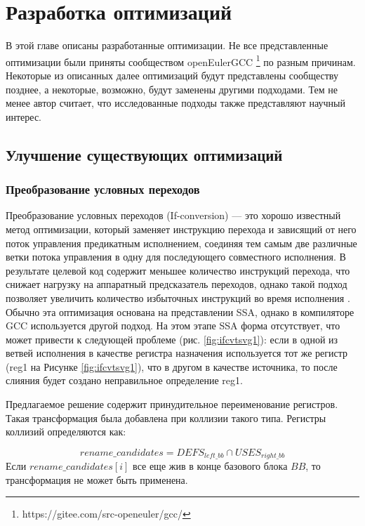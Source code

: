 \chapter{Разработка оптимизаций}\label{ch:ch2}

В этой главе описаны разработанные оптимизации. Не все представленные оптимизации были приняты сообществом openEulerGCC \footnote{https://gitee.com/src-openeuler/gcc/} по разным причинам. Некоторые из описанных далее оптимизаций будут представлены сообществу позднее, а некоторые, возможно, будут заменены другими подходами. Тем не менее автор считает, что исследованные подходы также представляют научный интерес.


\section{Улучшение существующих оптимизаций}\label{sec:ch2/sect1}
\subsection{Преобразование условных переходов} \label{opt:ifconv}
Преобразование условных переходов (If-conversion) — это хорошо известный метод оптимизации, который заменяет инструкцию перехода и зависящий от него поток управления предикатным исполнением, соединяя тем самым две различные ветки потока управления в одну для последующего совместного исполнения.  В результате целевой код содержит меньшее количество инструкций перехода, что снижает нагрузку на аппаратный предсказатель переходов, однако такой подход позволяет увеличить количество избыточных инструкций во время исполнения \cite{bruel2021if,E240105}. Обычно эта оптимизация основана на представлении SSA, однако в компиляторе GCC используется другой подход. На этом этапе SSA форма отсутствует, что может привести к следующей проблеме (рис. \ref{fig:ifcvtsvg1}): если в одной из ветвей исполнения в качестве регистра назначения используется  тот же регистр (reg1 на
Рисунке \ref{fig:ifcvtsvg1}), что в другом в качестве источника, то после слияния будет создано неправильное определение reg1.

Предлагаемое решение содержит принудительное переименование регистров. Такая трансформация была добавлена при коллизии такого типа. Регистры коллизий определяются как:

$$rename\_candidates = DEFS_{left\_bb} \cap USES_{right\_bb} $$
Если $rename\_candidates[i]$ все еще жив в конце базового блока $BB$, то трансформация не может быть применена.


